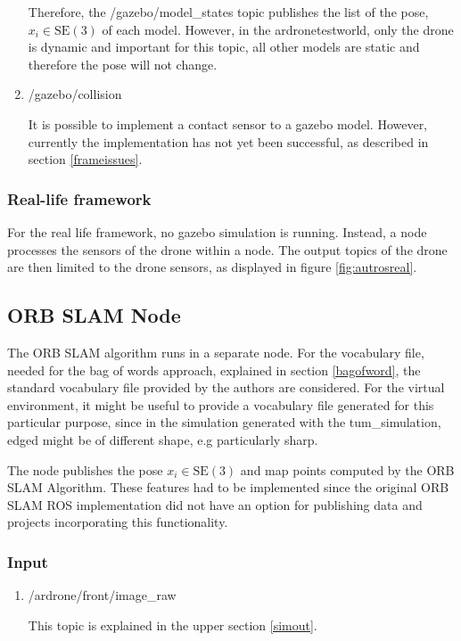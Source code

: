 \begin{enumerate}
	Therefore, the /gazebo/model\_states topic 
	publishes the list of the pose, $x_i \in \text{SE}(3)$ of each model. However, in the ardronetestworld, only the drone is dynamic and important for this topic, all other models 
	are static and therefore the pose will not change. 
	
	\item{/gazebo/collision}
	
	It is possible to implement a contact sensor to a gazebo model.
	However, currently the implementation has not yet been successful, as described in section \ref{frameissues}. 
	
	\end{enumerate}
	
	\subsubsection{Real-life framework}

	For the real life framework, no gazebo simulation is running. Instead, a node processes the sensors of the drone within a node. The output 
	topics of the drone are then limited to the drone sensors, as displayed in figure \ref{fig:autrosreal}.
	
	
	\subsection{ORB SLAM Node}\label{orbnode}
	
	The ORB SLAM algorithm runs in a separate node. For the vocabulary file, needed for the bag of words approach, explained in section \ref{bagofword}, the 
	standard vocabulary file provided by the authors are considered. For the virtual environment, it might be useful to provide a vocabulary file 
	generated for this particular purpose, since in the simulation generated with the tum\_simulation, edged might be of different shape, e.g particularly sharp. 
	
	The node publishes the pose $x_i \in \text{SE}(3)$ and map points computed by the ORB SLAM Algorithm. These features had to be implemented since the original ORB SLAM ROS implementation did not have an option
	for publishing data and projects incorporating  this functionality.
	
	\subsubsection{Input}
	
	\begin{enumerate}
	\item{/ardrone/front/image\_raw}
	
	This topic is explained in the upper section \ref{simout}.
	
	\end{enumerate}
	
